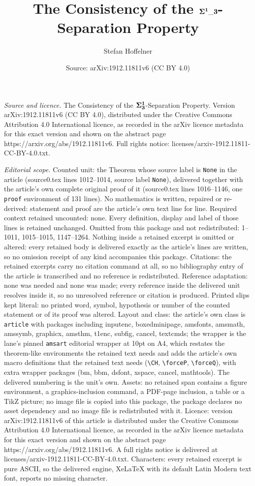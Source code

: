 \documentclass[10pt,a4paper]{amsart}
\title[The Consistency of the $\bf{\Sigma^1\_3}$-Separation Property]{The Consistency of the $\bf{\Sigma^1\_3}$-Separation Property}
\author{Stefan Hoffelner}
\date{Source: arXiv:1912.11811v6 (CC BY 4.0)}
\begin{document}
\maketitle

\noindent\emph{Source and licence.} The Consistency of the $\bf{\Sigma^1_3}$-Separation Property. Version arXiv:1912.11811v6 (CC BY 4.0), distributed under the Creative Commons Attribution 4.0 International licence, as recorded in the arXiv licence metadata for this exact version and shown on the abstract page https://arxiv.org/abs/1912.11811v6. Full rights notice: licenses/arxiv-1912.11811-CC-BY-4.0.txt.\par\smallskip

\noindent\textit{Editorial scope.} Counted unit: the Theorem whose source label is \texttt{None} in the article (source0.tex lines 1012--1014, source label \texttt{None}), delivered together with the article's own complete original proof of it (source0.tex lines 1016--1146, one \texttt{proof} environment of 131 lines). No mathematics is written, repaired or re-derived: statement and proof are the article's own text line for line. Required context retained uncounted: none. Every definition, display and label of those lines is retained unchanged. Omitted from this package and not redistributed: 1--1011, 1015--1015, 1147--1264. Nothing inside a retained excerpt is omitted or altered: every retained body is delivered exactly as the article's lines are written, so no omission receipt of any kind accompanies this package. Citations: the retained excerpts carry no citation command at all, so no bibliography entry of the article is transcribed and no reference is redistributed. Reference adaptation: none was needed and none was made; every reference inside the delivered unit resolves inside it, so no unresolved reference or citation is produced. Printed slips kept literal: no printed word, symbol, hypothesis or number of the counted statement or of its proof was altered. Layout and class: the article's own class is \texttt{article} with packages including inputenc, boxedminipage, amsfonts, amsmath, amssymb, graphicx, amsthm, t1enc, subfig, cancel, textcmds; the wrapper is the lane's pinned \texttt{amsart} editorial wrapper at 10pt on A4, which restates the theorem-like environments the retained text needs and adds the article's own macro definitions that the retained text needs (\texttt{\textbackslash CH}, \texttt{\textbackslash forceP}, \texttt{\textbackslash forceQ}), with extra wrapper packages (bm, bbm, dsfont, xspace, cancel, mathtools). The delivered numbering is the unit's own. Assets: no retained span contains a figure environment, a graphics-inclusion command, a PDF-page inclusion, a table or a TikZ picture; no image file is copied into this package, the package declares no asset dependency and no image file is redistributed with it. Licence: version arXiv:1912.11811v6 of this article is distributed under the Creative Commons Attribution 4.0 International licence, as recorded in the arXiv licence metadata for this exact version and shown on the abstract page https://arxiv.org/abs/1912.11811v6. A full rights notice is delivered at licenses/arxiv-1912.11811-CC-BY-4.0.txt. Characters: every retained excerpt is pure ASCII, so the delivered engine, XeLaTeX with its default Latin Modern text font, reports no missing character.
\end{document}
